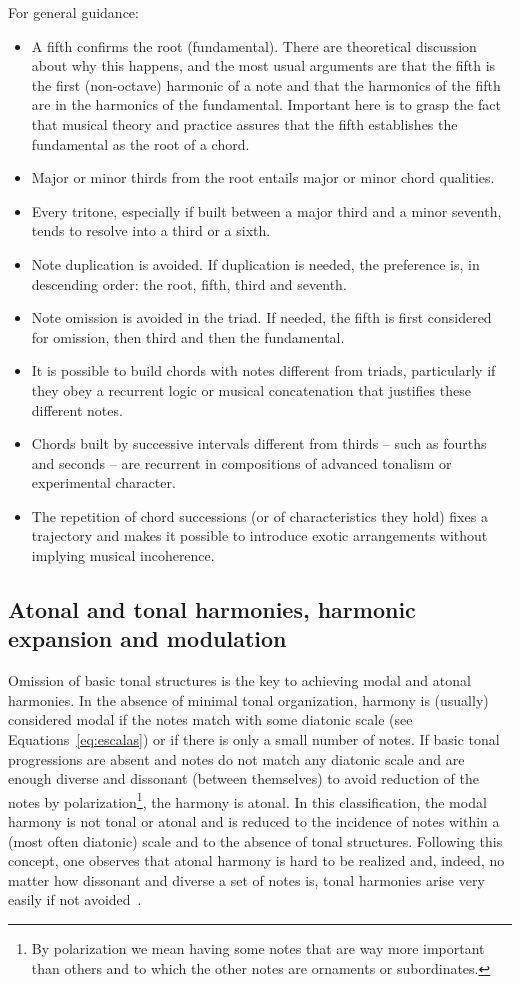 For general guidance:
\begin{itemize}
        \item A fifth confirms the root (fundamental).
		There are theoretical discussion about why this happens, and the most usual arguments are that the fifth is the first (non-octave) harmonic of a note and that the harmonics of the fifth are in the harmonics of the fundamental.
		Important here is to grasp the fact that musical theory and practice assures that the fifth establishes the fundamental as the root of a chord.
        \item Major or minor thirds from the root entails major or minor chord qualities.
        \item Every tritone, especially if built between a major third and a minor seventh, tends to resolve into a third or a sixth.
        \item Note duplication is avoided. If duplication is needed, the preference is, in descending order: the root, fifth, third and seventh.
        \item Note omission is avoided in the triad. If needed, the fifth is first considered for omission, then third and then the fundamental.
        \item It is possible to build chords with notes different from triads, particularly if they obey a recurrent logic or musical concatenation that justifies these different notes.
        \item Chords built by successive intervals different from thirds -- such as fourths and seconds -- are recurrent in compositions of advanced tonalism or experimental character.
        \item The repetition of chord successions (or of characteristics they hold) fixes a trajectory and makes it possible to 
introduce exotic arrangements without implying musical incoherence.
\end{itemize}

\subsection{Atonal and tonal harmonies, harmonic expansion and modulation}\label{subsec:harmonia}
Omission of basic tonal structures is the key to achieving modal and atonal harmonies. In the absence of minimal tonal organization,
harmony is (usually) considered modal if the notes match with some diatonic scale (see Equations~\ref{eq:escalas}) or if there is only a small number of notes. If basic tonal progressions are absent and notes do not match any diatonic scale and are enough diverse and dissonant (between themselves) to avoid reduction of the notes by polarization\footnote{By polarization we mean having some notes that are way more important than others and to which the other notes are ornaments or subordinates.}, the harmony is atonal. In this classification, the modal harmony is not tonal or atonal and is reduced to the incidence of notes within a (most often diatonic) scale and to the absence of tonal structures. Following this concept, one observes that atonal harmony is hard to be realized and, indeed, no matter how dissonant and diverse
a set of notes is, tonal harmonies arise very easily if not avoided~\cite{harmEXT}.

